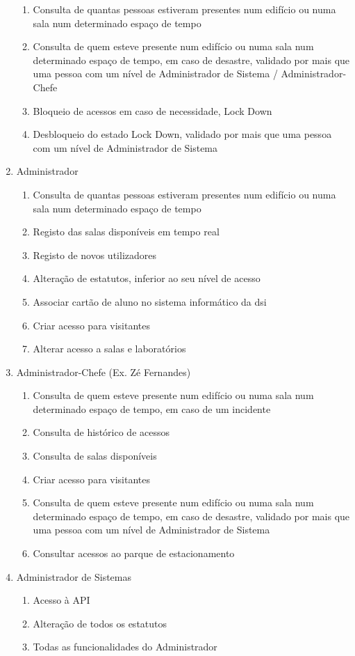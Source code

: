 \documentclass[a4paper]{report}
\begin{document}
\begin{enumerate}
\begin{enumerate}
	\item Consulta de quantas pessoas estiveram presentes num edifício ou numa sala num determinado espaço de tempo
    \item Consulta de quem esteve presente num edifício ou numa sala num determinado espaço de tempo, em caso de desastre, validado por mais que uma pessoa com um nível de Administrador de Sistema / Administrador-Chefe
    \item Bloqueio de acessos em caso de necessidade, Lock Down
    \item Desbloqueio do estado Lock Down, validado por mais que uma pessoa com um nível de Administrador de Sistema
	\end{enumerate}
\item Administrador
	\begin{enumerate}
    \item Consulta de quantas pessoas estiveram presentes num edifício ou numa sala num determinado espaço de tempo
    \item Registo das salas disponíveis em tempo real
    \item Registo de novos utilizadores
    \item Alteração de estatutos, inferior ao seu nível de acesso
    \item Associar cartão de aluno no sistema informático da dsi
    \item Criar acesso para visitantes
    \item Alterar acesso a salas e laboratórios
    \end{enumerate}
\item Administrador-Chefe (Ex. Zé Fernandes)
	\begin{enumerate}
	\item Consulta de quem esteve presente num edifício ou numa sala num determinado espaço de tempo, em caso de um incidente
    \item Consulta de histórico de acessos
    \item Consulta de salas disponíveis
    \item Criar acesso para visitantes
    \item Consulta de quem esteve presente num edifício ou numa sala num determinado espaço de tempo, em caso de desastre, validado por mais que uma pessoa com um nível de Administrador de Sistema
    \item Consultar acessos ao parque de estacionamento
	\end{enumerate}
\item Administrador de Sistemas
	\begin{enumerate}
    \item Acesso à API
    \item Alteração de todos os estatutos
    \item Todas as funcionalidades do Administrador
    \end{enumerate}
\end{enumerate}
\end{document}
